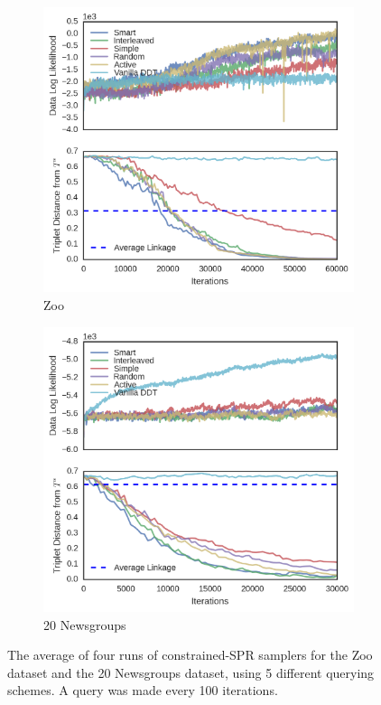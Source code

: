 \begin{figure}[h]
    \begin{subfigure}[b]{0.5\textwidth}
        \centering
        \includegraphics[width=\textwidth]{img/ibhc/Zoo-result.png}
        \caption{Zoo}
        \label{fig:zoo-result}
    \end{subfigure}
    \begin{subfigure}[b]{0.5\textwidth}
        \centering
        \includegraphics[width=\textwidth]{img/ibhc/20-Newsgroups-result.png}
        \caption{20 Newsgroups}
        \label{fig:20news-result}
    \end{subfigure}
    \caption{The average of four runs of constrained-SPR samplers
        for the Zoo dataset and the 20 Newsgroups dataset, using 5 different querying schemes.
        A query was made every 100 iterations.}
    \label{fig:main-results2}
\end{figure}
